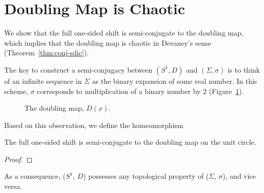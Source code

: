 \documentclass[10pt,twoside]{book}
\begin{document}
\section{Doubling Map is Chaotic}
We show that the full one-sided shift is semi-conjugate to the doubling map, which implies that the doubling map is chaotic in Devaney's sense (Theorem~\ref{thm:conj-sdic}).
\begin{center}
\end{center}
The key to construct a semi-conjugacy between $(S^1,D)$ and $(\Sigma, \sigma)$ is to think of an infinite sequence in $\Sigma$ as the binary expansion of some real number.
In this scheme, $\sigma$ corresponds to multiplication of a binary number by $2$ (Figure~\ref{fig:doubling}).
\begin{figure}[ht]
  \centering
  \label{fig:doubling}
  \caption{The doubling map, $D(x)$.}
\end{figure}

Based on this observation, we define the homeomorphism
\begin{proposition}
  The full one-sided shift is semi-conjugate to the doubling map on the unit circle.
  \begin{proof}
  \end{proof}
\end{proposition}
As a consequence, ($S^1$, $D$) possesses any topological property of ($\Sigma$, $\sigma$), and vice versa.
\end{document}
